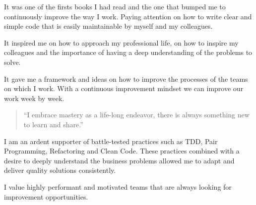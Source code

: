 \documentclass[10pt,a4paper,ragged2d,withhyper]{altacv}
\begin{document}
\begin{paracol}{2}
\medskip

It was one of the firsts books I had read and the one that bumped me to continuously improve the way I work. Paying attention on how to write clear and simple code that is easily maintainable by myself and my colleagues.

\divider

%
%

%
%

\medskip

It inspired me on how to approach my professional life, on how to inspire my colleagues and the importance of having a deep understanding of the problems to solve.

\divider

\medskip

It gave me a framework and ideas on how to improve the processes of the teams on which I work. With a continuous improvement mindset we can improve our work week by week.



\switchcolumn


\begin{quote}
``I embrace mastery as a life-long endeavor, there is always something new to learn and share.''
\end{quote}


I am an ardent supporter of battle-tested practices such as TDD, Pair Programming, Refactoring and Clean Code. These practices combined with a desire to deeply understand the business problems allowed me to adapt and deliver quality solutions consistently.

I value highly performant and motivated teams that are always looking for improvement opportunities.


\end{paracol}
\end{document}
